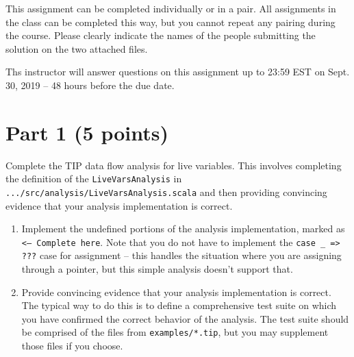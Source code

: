 \documentclass[12pt,letterpaper]{article}
\begin{document}
This assignment can be completed individually or in a pair.  All assignments in the class can be completed this way, but you cannot repeat any pairing during the course.  Please clearly indicate the names of the people submitting the solution on the two attached files.

Ths instructor will answer questions on this assignment up to 23:59 EST on Sept. 30, 2019 -- 48 hours before the due date. 

\section*{Part 1 (5 points)}
Complete the TIP data flow analysis for live variables.  This involves
completing the definition of the \texttt{LiveVarsAnalysis} in \texttt{.../src/analysis/LiveVarsAnalysis.scala} and then providing convincing evidence
that your analysis implementation is correct.
\begin{enumerate}
\item Implement the undefined portions of the analysis implementation, marked as \texttt{<--- Complete here}.  Note that you do not have to 
implement the \verb|case _ => ???| case for assignment -- this handles the situation where you are assigning through a pointer, but this simple analysis doesn't support that.
\item Provide convincing evidence that your analysis implementation is correct.  The typical way to do this is to define a comprehensive test suite on which you have confirmed the correct behavior of the analysis.  The test suite should be comprised of the files from \texttt{examples/*.tip}, but you may supplement those files if you choose.
\end{enumerate}
\end{document}
